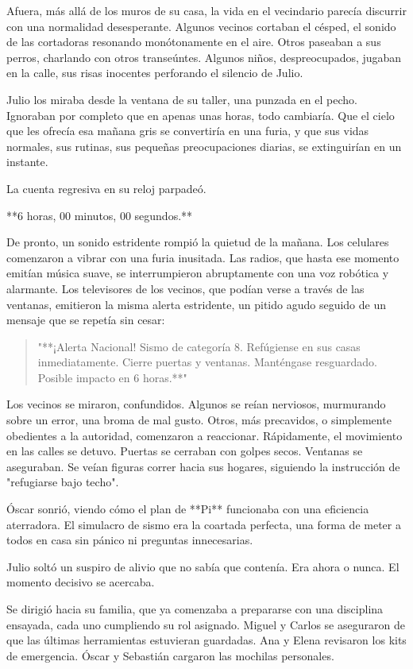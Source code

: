 \documentclass[a4paper,12pt]{book}
\begin{document}
Afuera, más allá de los muros de su casa, la vida en el vecindario parecía discurrir con una normalidad desesperante. Algunos vecinos cortaban el césped, el sonido de las cortadoras resonando monótonamente en el aire. Otros paseaban a sus perros, charlando con otros transeúntes. Algunos niños, despreocupados, jugaban en la calle, sus risas inocentes perforando el silencio de Julio.

Julio los miraba desde la ventana de su taller, una punzada en el pecho. Ignoraban por completo que en apenas unas horas, todo cambiaría. Que el cielo que les ofrecía esa mañana gris se convertiría en una furia, y que sus vidas normales, sus rutinas, sus pequeñas preocupaciones diarias, se extinguirían en un instante.

La cuenta regresiva en su reloj parpadeó.

**6 horas, 00 minutos, 00 segundos.**

De pronto, un sonido estridente rompió la quietud de la mañana. Los celulares comenzaron a vibrar con una furia inusitada. Las radios, que hasta ese momento emitían música suave, se interrumpieron abruptamente con una voz robótica y alarmante. Los televisores de los vecinos, que podían verse a través de las ventanas, emitieron la misma alerta estridente, un pitido agudo seguido de un mensaje que se repetía sin cesar:

\begin{quote}
    "**¡Alerta Nacional! Sismo de categoría 8. Refúgiense en sus casas inmediatamente. Cierre puertas y ventanas. Manténgase resguardado. Posible impacto en 6 horas.**"
\end{quote}

Los vecinos se miraron, confundidos. Algunos se reían nerviosos, murmurando sobre un error, una broma de mal gusto. Otros, más precavidos, o simplemente obedientes a la autoridad, comenzaron a reaccionar. Rápidamente, el movimiento en las calles se detuvo. Puertas se cerraban con golpes secos. Ventanas se aseguraban. Se veían figuras correr hacia sus hogares, siguiendo la instrucción de "refugiarse bajo techo".

Óscar sonrió, viendo cómo el plan de **Pi** funcionaba con una eficiencia aterradora. El simulacro de sismo era la coartada perfecta, una forma de meter a todos en casa sin pánico ni preguntas innecesarias.

Julio soltó un suspiro de alivio que no sabía que contenía. Era ahora o nunca. El momento decisivo se acercaba.

Se dirigió hacia su familia, que ya comenzaba a prepararse con una disciplina ensayada, cada uno cumpliendo su rol asignado. Miguel y Carlos se aseguraron de que las últimas herramientas estuvieran guardadas. Ana y Elena revisaron los kits de emergencia. Óscar y Sebastián cargaron las mochilas personales.
\end{document}
